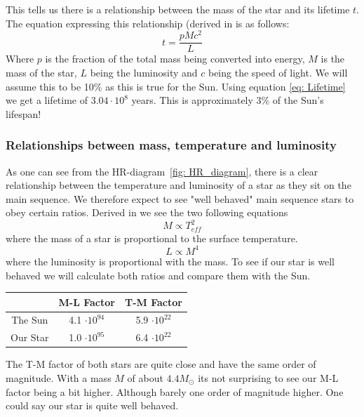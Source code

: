 \documentclass[reprint,english,notitlepage]{revtex4-2}
\begin{document}
This tells us there is a relationship between the mass of the star and its lifetime $ t $. The equation expressing this relationship (derived in %
is as follows:
\begin{equation} \label{eq: Lifetime}
  t = \frac{pMc^{2}}{L}
\end{equation}
Where $ p $ is the fraction of the total mass being converted into energy, $ M $ is the mass of the star, $ L $ being the luminosity and $ c $ being the speed of light. We will assume this to be 10\% as this is true for the Sun. Using equation \ref{eq: Lifetime} we get a lifetime of $ 3.04 ⋅ 10^{8} $ years. This is approximately 3\% of the Sun's lifespan!

\subsubsection*{Relationships between mass, temperature and luminosity}
As one can see from the HR-diagram~\ref{fig: HR_diagram}, there is a clear relationship between the temperature and luminosity of a star as they sit on the main sequence.
We therefore expect to see "well behaved" main sequence stars to obey certain ratios.
Derived in%
we see the two following equations
\begin{equation}\label{eq: T M ratio}
  M ∝ T^{2}_{eff}
\end{equation}
where the mass of a star is proportional to the surface temperature. 
\begin{equation}\label{eq: M L ratio}
  L ∝ M^{4}
\end{equation}
where the luminosity is proportional with the mass. To see if our star is well behaved we will calculate both ratios and compare them with the Sun. 

\begin{center}
  \begin{tabular}{|c|*{2}{c|}}
    \hline
     &M-L Factor  &T-M Factor  \\
    \hline
    The Sun  &4.1 $ ⋅ 10^{94} $ &5.9 $ ⋅ 10^{22} $ \\
    \hline
    Our Star  &1.0 $ ⋅ 10^{95} $ &6.4 $ ⋅ 10^{22} $ \\
    \hline
    \end{tabular}
\end{center}
The T-M factor of both stars are quite close and have the same order of magnitude. With a mass $ M $ of about $ 4.4 M_{⊙} $ its not surprising to see our M-L factor being a bit higher. Although barely one order of magnitude higher. One could say our star is quite well behaved. 
\end{document}
